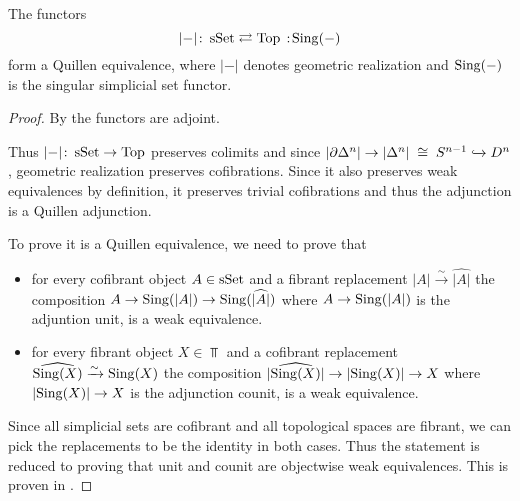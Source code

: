 \begin{prop}
    The functors
    \begin{equation*}
        \lvert-\rvert\colon\sSet\rightleftarrows\Top\mkern+3mu:\mkern-3mu\Sing(-)
    \end{equation*}
    form a Quillen equivalence, where $\lvert-\rvert$ denotes geometric realization and $\operatorname{Sing}(-)$ is the singular simplicial set functor.
    \begin{proof}
        By %
        the functors are adjoint.

        Thus $\lvert-\rvert\colon\operatorname{sSet}\to\operatorname{Top}$ preserves colimits and since $\lvert\partial\Delta^n\rvert\to\lvert\Delta^n\rvert\;\cong\;S^{n-1}\xhookrightarrow{} D^n$, geometric realization preserves cofibrations.
        Since it also preserves weak equivalences by definition, it preserves trivial cofibrations and thus the adjunction is a Quillen adjunction.

        To prove it is a Quillen equivalence, we need to prove that 
        \begin{itemize}
            \item for every cofibrant object $A\in\operatorname{sSet}$ and a fibrant replacement $\lvert A\rvert\xrightarrow{\sim}\widehat{\lvert A\rvert}$ the composition $A\to\operatorname{Sing}(\lvert A\rvert)\to\operatorname{Sing}(\widehat{\lvert A\rvert})$ where $A\to\operatorname{Sing}(\lvert A\rvert)$ is the adjuntion unit, is a weak equivalence.
            \item for every fibrant object $X\in\Top$ and a cofibrant replacement $\widehat{\operatorname{Sing}(X)}\xrightarrow{\sim}\operatorname{Sing}(X)$ the composition $\lvert\widehat{\operatorname{Sing}(X)}\rvert\to\lvert\operatorname{Sing}(X)\rvert\to X$ where $\lvert\operatorname{Sing}(X)\rvert\to X$ is the adjunction counit, is a weak equivalence.
        \end{itemize}
        Since all simplicial sets are cofibrant and all topological spaces are fibrant, we can pick the replacements to be the identity in both cases.
        Thus the statement is reduced to proving that unit and counit are objectwise weak equivalences. 
        This is proven in %
        .
    \end{proof}
\end{prop}
